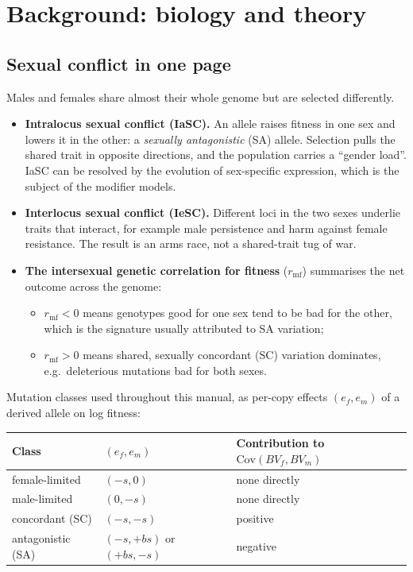 \chapter{Background: biology and theory}\label{ch:background}

\section{Sexual conflict in one page}
Males and females share almost their whole genome but are selected differently.
\begin{itemize}
\item \textbf{Intralocus sexual conflict (IaSC).} An allele raises fitness in one sex and lowers it in the other: a \emph{sexually antagonistic} (SA) allele. Selection pulls the shared trait in opposite directions, and the population carries a ``gender load''. IaSC can be resolved by the evolution of sex-specific expression, which is the subject of the modifier models.
\item \textbf{Interlocus sexual conflict (IeSC).} Different loci in the two sexes underlie traits that interact, for example male persistence and harm against female resistance. The result is an arms race, not a shared-trait tug of war.
\item \textbf{The intersexual genetic correlation for fitness} ($r_{\mathrm{mf}}$) summarises the net outcome across the genome:
  \begin{itemize}
  \item $r_{\mathrm{mf}}<0$ means genotypes good for one sex tend to be bad for the other, which is the signature usually attributed to SA variation;
  \item $r_{\mathrm{mf}}>0$ means shared, sexually concordant (SC) variation dominates, e.g.\ deleterious mutations bad for both sexes.
  \end{itemize}
\end{itemize}

Mutation classes used throughout this manual, as per-copy effects $(e_f,e_m)$ of a derived allele on log fitness:
\begin{center}\begin{tabular}{lll}\toprule
Class & $(e_f,e_m)$ & Contribution to $\mathrm{Cov}(BV_f,BV_m)$\\\midrule
female-limited & $(-s,0)$ & none directly\\
male-limited & $(0,-s)$ & none directly\\
concordant (SC) & $(-s,-s)$ & positive\\
antagonistic (SA) & $(-s,+b s)$ or $(+bs,-s)$ & negative\\\bottomrule\end{tabular}\end{center}

